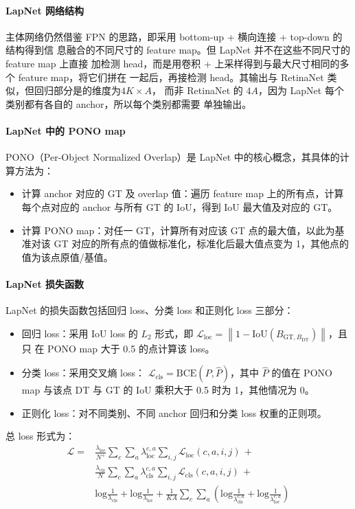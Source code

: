 \paragraph{LapNet 网络结构}
主体网络仍然借鉴 FPN 的思路，即采用 bottom-up + 横向连接 + top-down 的结构得到信
息融合的不同尺寸的 feature map。但 LapNet 并不在这些不同尺寸的feature map 上直接
加检测 head，而是用卷积 + 上采样得到与最大尺寸相同的多个 feature map，将它们拼在
一起后，再接检测 head。其输出与 RetinaNet 类似，但回归部分是的维度为$4 K \times A$，
而非 RetinaNet 的 $4A$，因为 LapNet 每个类别都有各自的 anchor，所以每个类别都需要
单独输出。

\paragraph{LapNet 中的 PONO map}
PONO（Per-Object Normalized Overlap）是 LapNet 中的核心概念，其具体的计算方法为：

\begin{itemize}
  \item 计算 anchor 对应的 GT 及 overlap 值：遍历 feature map 上的所有点，计算
    每个点对应的 anchor 与所有 GT 的 IoU，得到 IoU 最大值及对应的 GT。
  \item 计算 PONO map：对任一 GT，计算所有对应该 GT 点的最大值，以此为基准对该 GT
    对应的所有点的值做标准化，标准化后最大值点变为 1，其他点的值为该点原值/基值。
\end{itemize}

\paragraph{LapNet 损失函数}
LapNet 的损失函数包括回归 loss、分类 loss 和正则化 loss 三部分：

\begin{itemize}
  \item 回归 loss：采用 IoU loss 的 $L_2$ 形式，即 $\mathcal{L}_{\mathrm{loc}} =
    \left \| 1 - \mathrm{IoU}(B_{\mathrm{GT}, B_{\mathrm{DT}}}) \right\|$，且只
    在 PONO map 大于 0.5 的点计算该 loss。
  \item 分类 loss：采用交叉熵 loss：
    $\mathcal{L}_{\mathrm{cls}}=\mathrm{BCE}(P, \hat{P})$，其中 $\hat{P}$ 的值在
    PONO map 与该点 DT 与 GT 的 IoU 乘积大于 0.5 时为 1，其他情况为 0。
  \item 正则化 loss：对不同类别、不同 anchor 回归和分类 loss 权重的正则项。
\end{itemize}

总 loss 形式为：
\begin{align}
  \mathcal{L} = & \frac{\lambda_{\mathrm{loc}}}{N^+}\sum_c \sum_a \lambda_{\mathrm{loc}}^{c,a} \sum_{i, j}\mathcal{L}_{\mathrm{loc}}(c,a,i,j) \, + \\
                & \frac{\lambda_{\mathrm{cls}}}{N}\sum_c \sum_a \lambda_{\mathrm{cls}}^{c,a} \sum_{i, j}\mathcal{L}_{\mathrm{cls}}(c,a,i,j) \, + \\
                & \mathrm{log}\frac{1}{\lambda_{\mathrm{cls}}} + \mathrm{log}\frac{1}{\lambda_{\mathrm{loc}}} + \frac{1}{KA}\sum_{c}\sum_{a}\left( \mathrm{log}\frac{1}{\lambda_{\mathrm{cls}}^{c,a}} + \mathrm{log}\frac{1}{\lambda_{\mathrm{loc}}^{c,a}} \right)
\end{align}

